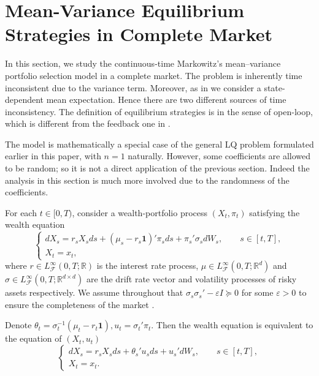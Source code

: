 \documentclass[final]{siamltex}
\begin{document}
\section{Mean-Variance Equilibrium Strategies in Complete Market}\label{random-case}

In this section, we study the continuous-time Markowitz's mean--variance portfolio selection model in a complete market.
The problem is inherently time inconsistent due to the variance term. Moreover, as in \cite{BMZ} we consider a state-dependent
mean expectation. Hence there are two different sources of time inconsistency. The definition of equilibrium strategies
is in the sense of open-loop, which is different from the feedback one in \cite{BM,BMZ}.

The model is mathematically a special case of the general LQ problem formulated earlier in this paper, with $n=1$ naturally. However,
some coefficients are allowed to be random; so it is not a direct application of the previous section. Indeed the analysis in
this section is much more involved due to the randomness of the coefficients.

For each $t\in [0, T)$, consider a wealth-portfolio
process $(X_t, \pi_t)$ satisfying the wealth equation
\begin{equation}\label{wealth}
 \left\{\begin{array}{l}
         dX_s=r_s X_sds+(\mu_s-r_s{{\mathbf 1}})'\pi_sds+\pi_s'\sigma_s dW_s,\qquad s\in [t,T],\\
     X_t=x_t,
        \end{array}
 \right.
\end{equation}
where $r\in  L_{{\mathcal F}}^{\infty}(0,T; {\mathbb{R}})$ is the interest rate process,
$\mu\in L_{{\mathcal F}}^{\infty}(0,T; {\mathbb{R}}^d)$ and $ \sigma \in L_{{\mathcal F}}^{\infty}(0,T; {\mathbb{R}}^{d\times d})$ are the drift rate vector
and volatility processes of risky assets respectively. We assume throughout that  $\sigma_s\sigma_s'-\varepsilon I\succeq 0$
for some $\varepsilon>0$ to ensure the completeness of the market .

Denote $\theta_t=\sigma_t^{-1}(\mu_t-r_t{{\mathbf 1}}), u_t=\sigma_t'\pi_t$. Then
the wealth equation is equivalent to the equation of $(X_t ,u_t)$
\begin{equation}\label{wealth2}
 \left\{\begin{array}{l}
         dX_s=r_s X_sds+\theta_s'u_sds+u_s'dW_s,\qquad s\in [t,T],\\
     X_t=x_t.
        \end{array}
 \right.
\end{equation}
\end{document}
